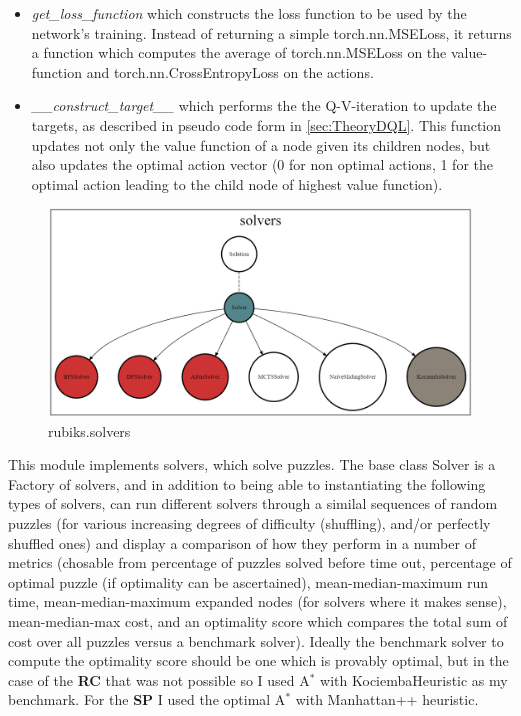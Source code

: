 \begin{itemize}
\begin{itemize}
\item \textit{get\_loss\_function} which constructs the loss function to be used by the network's training. Instead of returning a simple torch.nn.MSELoss, it returns a function which computes the average of torch.nn.MSELoss on the value-function and torch.nn.CrossEntropyLoss on the actions.
\item \textit{\_\_construct\_target\_\_} which performs the the Q-V-iteration to update the targets, as described in pseudo code form in \ref{sec:TheoryDQL}. This function updates not only the value function of a node given its children nodes, but also updates the optimal action vector (0 for non optimal actions, 1 for the optimal action leading to the child node of highest value function).
\end{itemize} 


\end{itemize}


\label{sec:codesolvers}
\begin{figure}[H]
\centering
\includegraphics[scale=0.25]{./Figures/codebasesolvers}
\caption[Codebase]{rubiks.solvers}
\label{fig:Codebasesolvers}
\end{figure}
This module implements solvers, which solve puzzles. The base class Solver is a Factory of solvers, and in addition to being able to instantiating the following types of solvers, can run different solvers through a similal sequences of random puzzles (for various increasing degrees of difficulty (shuffling), and/or perfectly shuffled ones) and display a comparison of how they perform in a number of metrics (chosable from percentage of puzzles solved before time out, percentage of optimal puzzle (if optimality can be ascertained), mean-median-maximum run time, mean-median-maximum expanded nodes (for solvers where it makes sense), mean-median-max cost, and an optimality score which compares the total sum of cost over all puzzles versus a benchmark solver). Ideally the benchmark solver to compute the optimality score should be one which is provably optimal, but in the case of the \textbf{RC} that was not possible so I used A$^{*}$ with KociembaHeuristic as my benchmark. For the \textbf{SP} I used the optimal A$^{*}$ with Manhattan++ heuristic.

